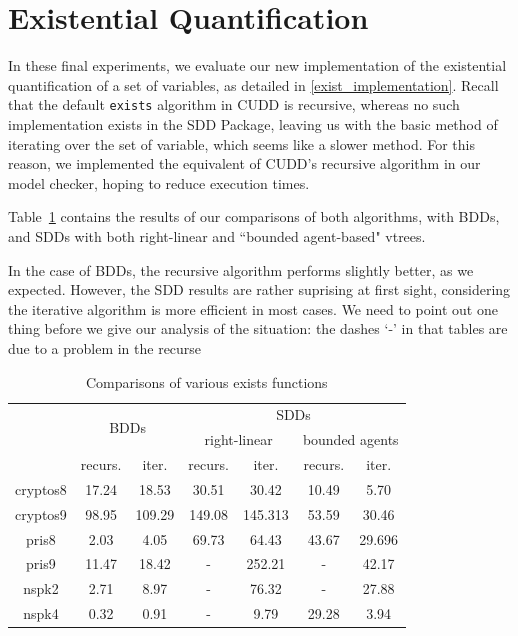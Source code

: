\documentclass[11pt]{report}
\begin{document}
\section{Existential Quantification}

In these final experiments, we evaluate our new implementation of the existential quantification of a set of variables, as detailed in \ref{exist_implementation}. Recall that the default \texttt{exists} algorithm in CUDD is recursive, whereas no such implementation exists in the SDD Package, leaving us with the basic method of iterating over the set of variable, which seems like a slower method. For this reason, we implemented the equivalent of CUDD's recursive algorithm in our model checker, hoping to reduce execution times. 

Table~\ref{table:existcomparisons} contains the results of our comparisons of both algorithms, with BDDs, and SDDs with both right-linear and ``bounded agent-based" vtrees. 

In the case of BDDs, the recursive algorithm performs slightly better, as we expected. However, the SDD results are rather suprising at first sight, considering the iterative algorithm is more efficient in most cases. 
We need to point out one thing before we give our analysis of the situation: the dashes `-' in that tables are due to a problem in the recurse


\begin{table}
\centering
\begin{tabular}{|*{7}{c|}}
\hline
 &\multicolumn{2}{c|}{\multirow{2}{*}{BDDs}} & \multicolumn{4}{c|}{SDDs}  \\ \cline{4-7}
 & \multicolumn{2}{c|}{}& \multicolumn{2}{c|}{right-linear}& \multicolumn{2}{c|}{bounded agents}\\ \hline
 & recurs. & iter. & recurs. & iter. & recurs. & iter. \\ \hline 
cryptos8 &17.24 & 18.53 & 30.51 & 30.42 & 10.49 & 5.70\\ \hline
cryptos9 & 98.95  & 109.29 & 149.08 & 145.313 & 53.59 & 30.46\\ \hline
pris8 & 2.03 & 4.05  & 69.73&64.43  &43.67 & 29.696 \\ \hline
pris9 & 11.47& 18.42 & - & 252.21 & -& 42.17 \\ \hline
nspk2 & 2.71 & 8.97 & - & 76.32 & -& 27.88\\ \hline
nspk4 & 0.32 & 0.91 & - & 9.79 & 29.28 & 3.94 \\ \hline
\end{tabular}
\caption{Comparisons of various exists functions}
\label{table:existcomparisons}
\end{table}
\end{document}
